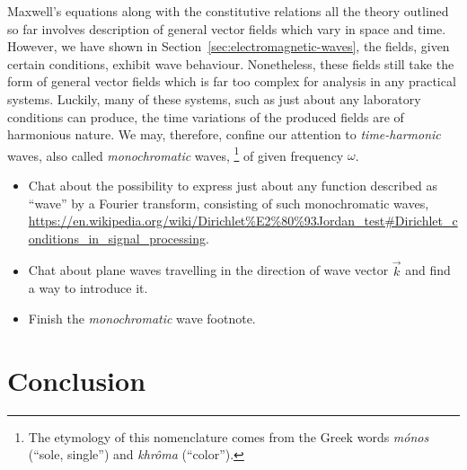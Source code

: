 \documentclass[11pt,a4paper,twoside,openany]{report}
\begin{document}
            Maxwell's equations along with the constitutive relations all the theory outlined so far involves description of general vector fields which vary in space and time. However, we have shown in Section~\ref{sec:electromagnetic-waves}, the fields, given certain conditions, exhibit wave behaviour. Nonetheless, these fields still take the form of general vector fields which is far too complex for analysis in any practical systems. Luckily, many of these systems, such as just about any laboratory conditions can produce, the time variations of the produced fields are of harmonious nature. We may, therefore, confine our attention to \emph{time-harmonic} waves, also called \emph{monochromatic} waves,%
                \footnote{The etymology of this nomenclature comes from the Greek words \emph{m\'onos} (\enquote{sole, single}) and \emph{khr\^oma} (\enquote{color}).}
            of given frequency $\omega$.
            \begin{itemize}
                \item Chat about the possibility to express just about any function described as \enquote{wave} by a Fourier transform, consisting of such monochromatic waves, \url{https://en.wikipedia.org/wiki/Dirichlet%E2%80%93Jordan_test#Dirichlet_conditions_in_signal_processing}.
                \item Chat about plane waves travelling in the direction of wave vector $\vec k$ and find a way to introduce it.
                \item Finish the \emph{monochromatic} wave footnote.
            \end{itemize}
    
    \chapter*{Conclusion}
    \label{chap:conclusion}
    
    \lipsum[10-13]

    \printnomenclature
    
    \printbibliography[heading=bibintoc]

	\printindex
\end{document}
